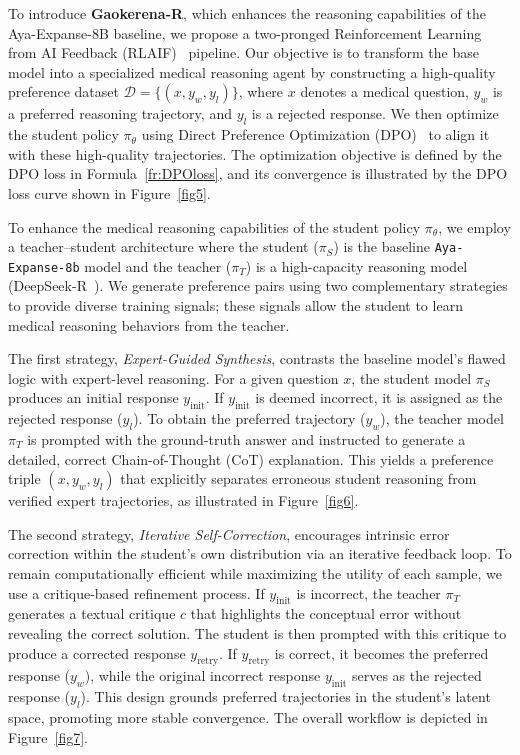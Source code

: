 \documentclass[review]{elsarticle}
\begin{document}
To introduce \textbf{Gaokerena-R}, which enhances the reasoning capabilities of the Aya-Expanse-8B baseline, we propose a two-pronged Reinforcement Learning from AI Feedback (RLAIF)~\cite{b30} pipeline. Our objective is to transform the base model into a specialized medical reasoning agent by constructing a high-quality preference dataset $\mathcal{D}=\{(x,y_w,y_l)\}$, where $x$ denotes a medical question, $y_w$ is a preferred reasoning trajectory, and $y_l$ is a rejected response. We then optimize the student policy $\pi_\theta$ using Direct Preference Optimization (DPO)~\cite{b31} to align it with these high-quality trajectories. The optimization objective is defined by the DPO loss in Formula~\ref{fr:DPOloss}, and its convergence is illustrated by the DPO loss curve shown in Figure~\ref{fig5}.

To enhance the medical reasoning capabilities of the student policy $\pi_\theta$, we employ a teacher--student architecture where the student ($\pi_S$) is the baseline \texttt{Aya-Expanse-8b} model and the teacher ($\pi_T$) is a high-capacity reasoning model (DeepSeek-R~\cite{b32}). We generate preference pairs using two complementary strategies to provide diverse training signals; these signals allow the student to learn medical reasoning behaviors from the teacher.

The first strategy, \textit{Expert-Guided Synthesis}, contrasts the baseline model's flawed logic with expert-level reasoning. For a given question $x$, the student model $\pi_S$ produces an initial response $y_{\text{init}}$. If $y_{\text{init}}$ is deemed incorrect, it is assigned as the rejected response ($y_l$). To obtain the preferred trajectory ($y_w$), the teacher model $\pi_T$ is prompted with the ground-truth answer and instructed to generate a detailed, correct Chain-of-Thought (CoT) explanation. This yields a preference triple $(x,y_w,y_l)$ that explicitly separates erroneous student reasoning from verified expert trajectories, as illustrated in Figure~\ref{fig6}.

The second strategy, \textit{Iterative Self-Correction}, encourages intrinsic error correction within the student's own distribution via an iterative feedback loop. To remain computationally efficient while maximizing the utility of each sample, we use a critique-based refinement process. If $y_{\text{init}}$ is incorrect, the teacher $\pi_T$ generates a textual critique $c$ that highlights the conceptual error without revealing the correct solution. The student is then prompted with this critique to produce a corrected response $y_{\text{retry}}$. If $y_{\text{retry}}$ is correct, it becomes the preferred response ($y_w$), while the original incorrect response $y_{\text{init}}$ serves as the rejected response ($y_l$). This design grounds preferred trajectories in the student's latent space, promoting more stable convergence. The overall workflow is depicted in Figure~\ref{fig7}.
\end{document}
